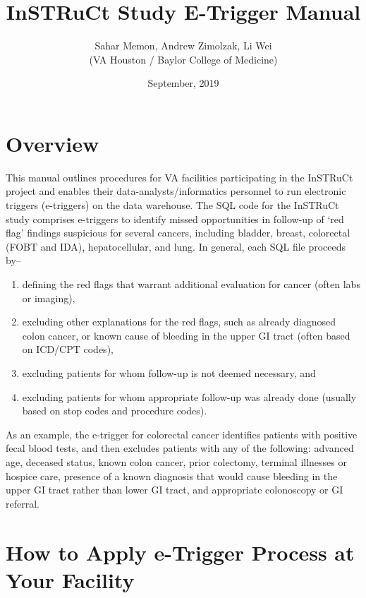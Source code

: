 \documentclass{article}
\author{Sahar Memon, Andrew Zimolzak, Li Wei\\(VA Houston / Baylor
  College of Medicine)}
\title{InSTRuCt Study E-Trigger Manual}
\date{September, 2019}
\begin{document}
\maketitle

\section{Overview}

This manual outlines procedures for VA facilities participating in the
InSTRuCt project and enables their data-analysts/informatics personnel
to run electronic triggers (e-triggers) on the data warehouse. The SQL
code for the InSTRuCt study comprises e-triggers to identify missed
opportunities in follow-up of `red flag' findings suspicious for
several cancers, including bladder, breast, colorectal (FOBT and IDA),
hepatocellular, and lung. In general, each SQL file proceeds by--

\begin{enumerate}
\item defining the red flags that warrant additional evaluation for
  cancer (often labs or imaging),

\item excluding other explanations for the red flags, such as already
  diagnosed colon cancer, or known cause of bleeding in the upper GI
  tract (often based on ICD/CPT codes),

\item excluding patients for whom follow-up is not deemed necessary,
  and

\item excluding patients for whom appropriate follow-up was already
  done (usually based on stop codes and procedure codes).
\end{enumerate}

As an example, the e-trigger for colorectal cancer identifies patients
with positive fecal blood tests, and then excludes patients with any
of the following: advanced age, deceased status, known colon cancer,
prior colectomy, terminal illnesses or hospice care, presence of a
known diagnosis that would cause bleeding in the upper GI tract rather
than lower GI tract, and appropriate colonoscopy or GI referral.

\section{How to Apply e-Trigger Process at Your Facility}
\end{document}
